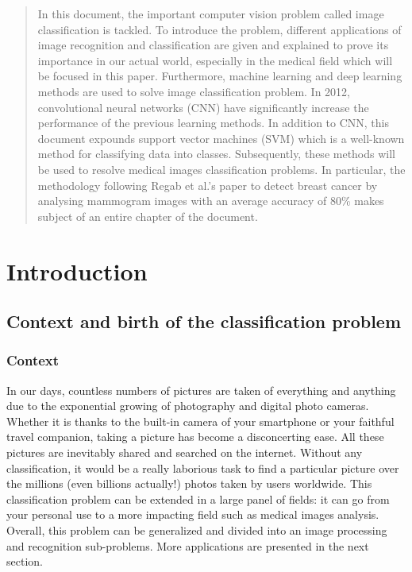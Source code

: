 \documentclass[11pt, openany]{report}
\theoremstyle{plain}
\theoremstyle{definition}
\theoremstyle{remark}
\begin{document}
\begin{abstract}

In this document, the important computer vision problem called image classification is tackled. To introduce the problem, different applications of image recognition and classification are given and explained to prove its importance in our actual world,  especially in the medical field which will be focused in this paper. Furthermore, machine learning and deep learning methods are used to solve image classification problem. In 2012, convolutional neural networks (CNN) have significantly increase the performance of the previous learning methods. In addition to CNN, this document expounds support vector machines (SVM) which is a well-known method for classifying data into classes. Subsequently, these methods will be used to resolve medical images classification problems. In particular, the methodology following Regab et al.'s paper \cite{breast-cancer} to detect breast cancer by analysing mammogram images with an average accuracy of 80\%  makes subject of an entire chapter of the document.      

\end{abstract}

\tableofcontents


\chapter{Introduction}

\section{Context and birth of the classification problem}

\subsection{Context}

In our days, countless numbers of pictures are taken of everything and anything due to the exponential growing of photography and digital photo cameras. Whether it is thanks to the built-in camera of your smartphone or your faithful travel companion, taking a picture has become a disconcerting ease. All these pictures are inevitably shared and searched on the internet. Without any classification, it would be a really laborious task to find a particular picture over the millions (even billions actually!) photos taken by users worldwide. This classification problem can be extended in a large panel of fields: it can go from your personal use to a more impacting field such as medical images analysis. Overall, this problem can be generalized and divided into an image processing and recognition sub-problems. More applications are presented in the next section.  \\
\end{document}
